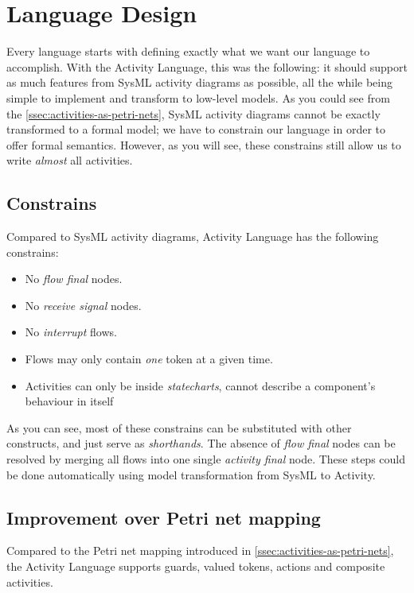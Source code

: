 \section{Language Design}

Every language starts with defining exactly what we want our language to accomplish. With the Activity Language, this was the following: it should support as much features from SysML activity diagrams as possible, all the while being simple to implement and transform to low-level models. As you could see from the \autoref{ssec:activities-as-petri-nets}, SysML activity diagrams cannot be exactly transformed to a formal model; we have to constrain our language in order to offer formal semantics. However, as you will see, these constrains still allow us to write \emph{almost} all activities.

\subsection{Constrains}

Compared to SysML activity diagrams, Activity Language has the following constrains:

\begin{itemize}
	\item No \emph{flow final} nodes.
	\item No \emph{receive signal} nodes.
	\item No \emph{interrupt} flows.
	\item Flows may only contain \emph{one} token at a given time.
	\item Activities can only be inside \emph{statecharts}, cannot describe a component's behaviour in itself
\end{itemize}

As you can see, most of these constrains can be substituted with other constructs, and just serve as \emph{shorthands}. The absence of \emph{flow final} nodes can be resolved by merging all flows into one single \emph{activity final} node. These steps could be done automatically using model transformation from SysML to Activity.

\subsection{Improvement over Petri net mapping}

Compared to the Petri net mapping introduced in \autoref{ssec:activities-as-petri-nets}, the Activity Language supports guards, valued tokens, actions and composite activities.
